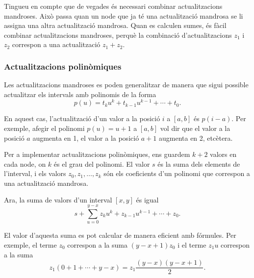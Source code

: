 \begin{center}
\end{center}


Tingueu en compte que de vegades és necessari combinar actualitzacions
mandroses. Això passa quan un node que ja té una actualització
mandrosa se li assigna una altra actualització mandrosa. Quan es
calculen sumes, és fàcil combinar actualitzacions mandroses, perquè la
combinació d'actualitzacions $z_1$ i $z_2$ correspon a una
actualització $z_1+z_2$.

\subsubsection{Actualitzacions polinòmiques}

Les actualitzacions mandroses es poden generalitzar de manera que sigui
possible actualitzar els intervals amb polinomis de la forma
\[p(u) = t_k u^k + t_{k-1} u^{k-1} + \cdots + t_0.\]


En aquest cas, l'actualització d'un valor a la posició $i$ a $[a,b]$
és $p(i-a)$. Per exemple, afegir el polinomi $p(u)=u+1$ a $[a,b]$ vol
dir que el valor a la posició $a$ augmenta en 1, el valor a la posició
$a+1$ augmenta en 2, etcètera.

Per a implementar actualitzacions polinòmiques, ens guardem $k+2$
valors en cada node, on $k$ és el grau del polinomi. El valor
$s$ és la suma dels elements de l'interval, i els valors
$z_0,z_1,\ldots,z_k$ són els coeficients d'un polinomi que correspon a
una actualització mandrosa.

Ara, la suma de valors d'un interval $[x,y]$ és igual
\[s+\sum_{u=0}^{y-x} z_k u^k + z_{k-1} u^{k-1} + \cdots + z_0.\]


El valor d'aquesta suma es pot calcular de manera eficient amb fórmules. Per exemple, el terme $z_0$ correspon a la suma $(y-x+1)z_0$ i el terme $z_1 u$ correspon a la suma
\[z_1(0+1+\cdots+y-x) = z_1 \frac{(y-x)(y-x+1)}{2} .\]


